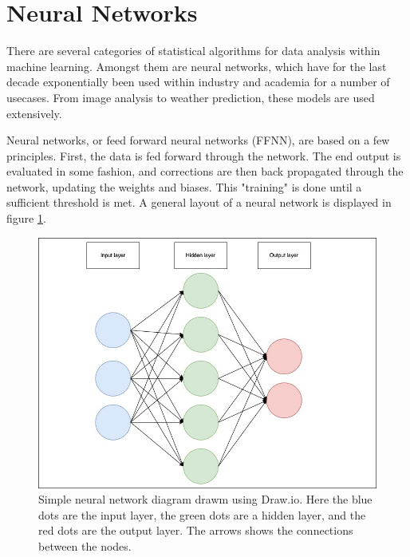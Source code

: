 \section{Neural Networks}
There are several categories of statistical algorithms for data analysis within machine learning.
Amongst them are neural networks, which have for the last decade exponentially been used
within industry and academia for a number of usecases. From image analysis to weather prediction,
these models are used extensively. \par
Neural networks, or feed forward neural networks (FFNN), are based on a few principles.
First, the data is fed forward through the network. The end output is evaluated in some fashion, 
and corrections are then back propagated through the network, updating the weights and biases. 
This "training" is done until a sufficient threshold is met. A general layout of a neural network is displayed in
figure \ref{fig:nndiagram}.

\begin{figure}
    \includegraphics[width=\linewidth]{Figures/Machinelearning/nn_diagram.jpeg}
    \caption[Simple diagram of a neural network]{Simple neural network diagram drawm using Draw.io. Here the blue dots are the input layer, the green dots are a hidden layer, 
    and the red dots are the output layer. The arrows shows the connections between the nodes. }
    \label{fig:nndiagram}
\end{figure}

